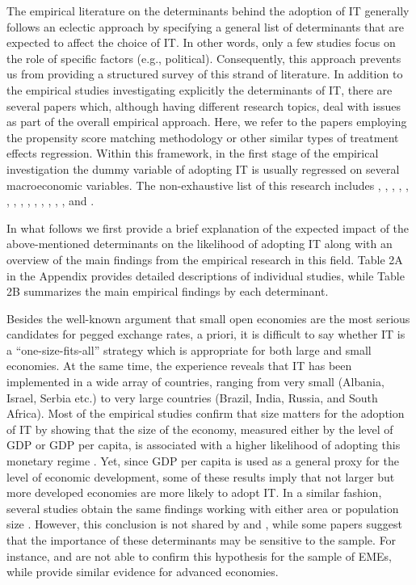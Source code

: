 \documentclass{article}
\begin{document}
The empirical literature on the determinants behind the adoption of IT generally follows an eclectic approach by specifying a general list of determinants that are expected to affect the choice of IT. In other words, only a few studies focus on the role of specific factors (e.g., political). Consequently, this approach prevents us from providing a structured survey of this strand of literature. In addition to the empirical studies investigating explicitly the determinants of IT, there are several papers which, although having different research topics, deal with issues as part of the overall empirical approach. Here, we refer to the papers employing the propensity score matching methodology or other similar types of treatment effects regression. Within this framework, in the first stage of the empirical investigation the dummy variable of adopting IT is usually regressed on several macroeconomic variables. The non-exhaustive list of this research includes \citet{ardakani2018}, \citet{arsic2022}, \citet{demendonca2012}, \citet{fry-mckibbin2014}, \citet{goncalves2009}, \citet{lin2010}, \citet{lin2007, lin2009}, \citet{lucotte2012}, \citet{minea2014}, \citet{minea2021}, \citet{mukherjee2008}, \citet{pontines2013}, \citet{samarina2014}, \citet{vega2005}, and \citet{yamada2013}.

In what follows we first provide a brief explanation of the expected impact of the above-mentioned determinants on the likelihood of adopting IT along with an overview of the main findings from the empirical research in this field. Table 2A in the Appendix provides detailed descriptions of individual studies, while Table 2B summarizes the main empirical findings by each determinant.

Besides the well-known argument that small open economies are the most serious candidates for pegged exchange rates, a priori, it is difficult to say whether IT is a “one-size-fits-all” strategy which is appropriate for both large and small economies. At the same time, the experience reveals that IT has been implemented in a wide array of countries, ranging from very small (Albania, Israel, Serbia etc.) to very large countries (Brazil, India, Russia, and South Africa). Most of the empirical studies confirm that size matters for the adoption of IT by showing that the size of the economy, measured either by the level of GDP or GDP per capita, is associated with a higher likelihood of adopting this monetary regime \citep{deMendonca2012, Leyva2008, Lucotte2010, Minea2021, Samarina2014, Yamada2013}. Yet, since GDP per capita is used as a general proxy for the level of economic development, some of these results imply that not larger but more developed economies are more likely to adopt IT. In a similar fashion, several studies obtain the same findings working with either area or population size \citep{Arsic2022, Rose2014, Wang2016, Yamada2013}. However, this conclusion is not shared by \citet{hu2006} and \citet{ismailov2016}, while some papers suggest that the importance of these determinants may be sensitive to the sample. For instance, \citet{carare2006} and \citet{fouejieu2017} are not able to confirm this hypothesis for the sample of EMEs, while \citet{samarina2014} provide similar evidence for advanced economies.
\end{document}
